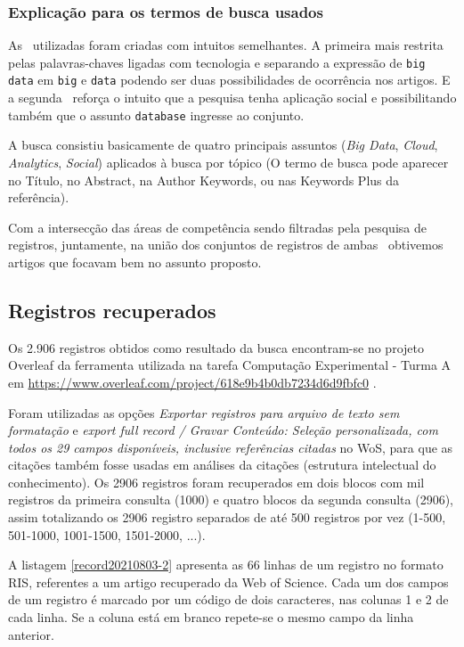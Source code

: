 \subsubsection{Explicação para os termos de busca usados\label{MASSA:query}}

As \query\ utilizadas foram criadas com intuitos semelhantes. A primeira mais restrita pelas palavras-chaves ligadas com tecnologia e separando a expressão de \texttt{big data} em \texttt{big} e \texttt{data} podendo ser duas possibilidades de ocorrência nos artigos. E a segunda \query\ reforça o intuito que a pesquisa tenha aplicação social e possibilitando também que o assunto  \texttt{database} ingresse ao conjunto.

A busca consistiu basicamente de quatro principais assuntos (\textit{Big Data}, \textit{Cloud}, \textit{Analytics}, \textit{Social}) aplicados à busca por tópico (O termo de busca pode aparecer no Título, no Abstract, na Author Keywords, ou nas Keywords Plus da referência).

Com a intersecção das áreas de competência sendo filtradas pela pesquisa de registros, juntamente, na união dos conjuntos de registros de ambas \query\ obtivemos artigos que focavam bem no assunto proposto.

\subsection{Registros recuperados}

Os 2.906 registros obtidos como resultado da busca encontram-se no projeto Overleaf da ferramenta utilizada na tarefa Computação Experimental - Turma A em \url{https://www.overleaf.com/project/618e9b4b0db7234d6d9fbfc0} . 

Foram utilizadas as opções \textit{Exportar registros para arquivo de texto sem formatação} e \textit{export full record / Gravar Conteúdo: Seleção personalizada, com todos os 29 campos disponíveis, inclusive referências citadas} no WoS, para que as citações também fosse usadas em análises da citações (estrutura intelectual do conhecimento). Os 2906 registros foram recuperados em dois blocos com mil registros da primeira consulta (1000) e quatro blocos da segunda consulta (2906), assim totalizando os 2906 registro  separados de até 500 registros por vez (1-500, 501-1000, 1001-1500, 1501-2000, ...).

A listagem \ref{record20210803-2} apresenta as 66 linhas de um registro no formato RIS, referentes a um artigo recuperado da Web of Science. Cada um dos campos de um registro é marcado por um código de dois caracteres, nas colunas 1 e 2 de cada linha. Se a coluna está em branco repete-se o mesmo campo da linha anterior.

